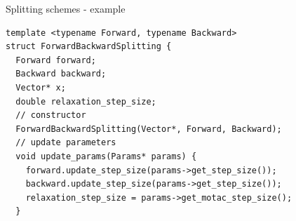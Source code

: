 \documentclass[hyperref,handout,compress,9pt,mathserif]{beamer}
\begin{document}
\begin{frame}[fragile]{Splitting schemes - example}
\begin{small}
\begin{lstlisting}
template <typename Forward, typename Backward>                                                                                                                                       
struct ForwardBackwardSplitting {                                                                                                                                                    
  Forward forward;                                                                                                                                                                   
  Backward backward;                                                                                                                                                                 
  Vector* x;                                                                                                                                                                         
  double relaxation_step_size;                                                                                                                                                       
  // constructor                                                                                                                                                                                   
  ForwardBackwardSplitting(Vector*, Forward, Backward);
  // update parameters                                                                                                                                                                                   
  void update_params(Params* params) {                                                                                                                                               
    forward.update_step_size(params->get_step_size());                                                                                                                               
    backward.update_step_size(params->get_step_size());                                                                                                                              
    relaxation_step_size = params->get_motac_step_size();                                                                                                                            
  }                                                                                                                                                                                  

\end{lstlisting}
\end{small}
\end{frame}
\end{document}

